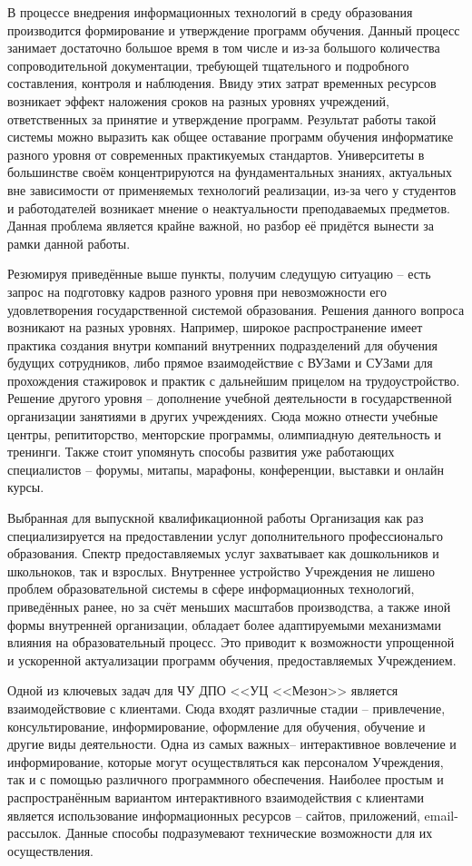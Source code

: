 В процессе внедрения информационных технологий в среду образования производится формирование и утверждение программ обучения.
Данный процесс занимает достаточно большое время в том числе и из-за большого количества сопроводительной документации, требующей тщательного и подробного составления, контроля и наблюдения.
Ввиду этих затрат временных ресурсов возникает эффект наложения сроков на разных уровнях учреждений, ответственных за принятие и утверждение программ.
Результат работы такой системы можно выразить как общее оставание программ обучения информатике разного уровня от современных практикуемых стандартов.
Университеты в большинстве своём концентрируются на фундаментальных знаниях, актуальных вне зависимости от применяемых технологий реализации, из-за чего у студентов и работодателей возникает мнение о неактуальности преподаваемых предметов.
Данная проблема является крайне важной, но разбор её придётся вынести за рамки данной работы.

Резюмируя приведённые выше пункты, получим следущую ситуацию -- есть запрос на подготовку кадров разного уровня при невозможности его удовлетворения государственной системой образования.
Решения данного вопроса возникают на разных уровнях.
Например, широкое распространение имеет практика создания внутри компаний внутренних подразделений для обучения будущих сотрудников, либо прямое взаимодействие с ВУЗами и СУЗами для прохождения стажировок и практик с дальнейшим прицелом на трудоустройство.
Решение другого уровня -- дополнение учебной деятельности в государственной организации занятиями в других учреждениях.
Сюда можно отнести учебные центры, репититорство, менторские программы, олимпиадную деятельность и тренинги.
Также стоит упомянуть способы развития уже работающих специалистов -- форумы, митапы, марафоны, конференции, выставки и онлайн курсы.

Выбранная для выпускной квалификационной работы Организация как раз специализируется на предоставлении услуг дополнительного профессиональго образования.
Спектр предоставляемых услуг захватывает как дошкольников и школьноков, так и взрослых.
Внутреннее устройство Учреждения не лишено проблем образовательной системы в сфере информационных технологий, приведённых ранее, но за счёт меньших масштабов производства, а также иной формы внутренней организации, обладает более адаптируемыми механизмами влияния на образовательный процесс.
Это приводит к возможности упрощенной и ускоренной актуализации программ обучения, предоставляемых Учреждением.

Одной из ключевых задач для ЧУ ДПО <<УЦ <<Мезон>> является взаимодействовие с клиентами.
Сюда входят различные стадии -- привлечение, консультирование, информирование, оформление для обучения, обучение и другие виды деятельности.
Одна из самых важных-- интерактивное вовлечение и информирование, которые могут осуществляться как персоналом Учреждения, так и с помощью различного программного обеспечения.
Наиболее простым и распространённым вариантом интерактивного взаимодействия с клиентами является использование информационных ресурсов -- сайтов, приложений, email-рассылок.
Данные способы подразумевают технические возможности для их осуществления.

